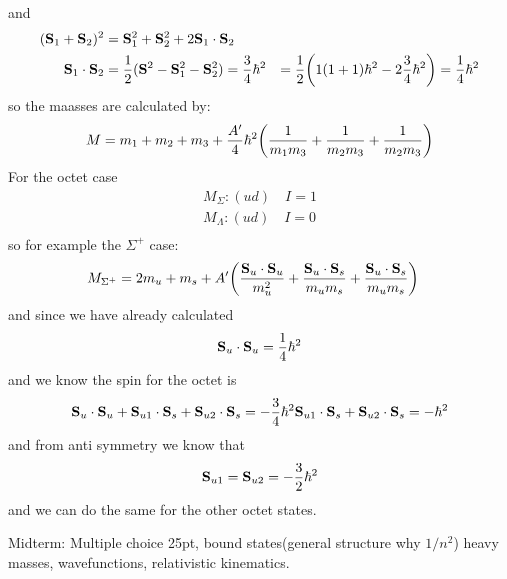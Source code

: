\documentclass[../main.tex]{subfiles}
\begin{document}
\begin{itemize}
    and
    \begin{align*}
        (\vb S_1 + \vb S_2)^2 &= \vb S_1^2 + \vb S_2^2 + 2\vb S_1 \cdot \vb S_2 \\
        \vb S_1 \cdot \vb S_2 &= \frac{1}{2} (\vb S^2 - \vb S_1^2 - \vb S_2^2) = \frac{3}{4} \hbar^2
        &= \frac{1}{2} \qt(1(1 + 1)\hbar^2 - 2 \frac{3}{4}\hbar^2) = \frac{1}{4} \hbar^2
    \end{align*}
    so the maasses are calculated  by:
    \begin{align*}
        M = m_1 + m_2 + m_3 + \frac{A'}{4}\hbar^2 \qt(\frac{1}{m_1 m_3} + \frac{1}{m_2 m_3} + \frac{1}{m_2 m_3})
    \end{align*}
    For the octet case
    \begin{align*}
        M_\Sigma: (ud) \quad I = 1 \\
        M_\Lambda: (ud) \quad I = 0 \\
    \end{align*}
    so for example the $\Sigma^+$ case:
    \begin{align*}
        M_{\Sigma^+} &= 2m_u + m_s + A' \qt(\frac{\vb S_u \cdot \vb S_u}{m_u^2} 
            + \frac{\vb S_u \cdot \vb S_s}{m_u m_s} + \frac{\vb S_u \cdot \vb S_s}{m_u m_s})
    \end{align*}
    and since we have already calculated 
    \begin{align*}
        \vb S_u \cdot \vb S_u = \frac{1}{4} \hbar^2 
    \end{align*}
    and we know the spin for the octet is
    \begin{align*}
        \vb S_u \cdot \vb S_u + \vb S_{u1} \cdot \vb S_s + \vb S_{u2} \cdot \vb S_s = -\frac{3}{4} \hbar^2
        \vb S_{u1} \cdot \vb S_s + \vb S_{u2} \cdot \vb S_s = - \hbar^2
    \end{align*}
    and from anti symmetry we know that
    \begin{align*}
        \vb S_{u1} = \vb S_{u2} = -\frac{3}{2} \hbar^2
    \end{align*}
    and we can do the same for the other octet states.
\end{itemize}
Midterm: Multiple choice 25pt, bound states(general structure why $1/n^2$) heavy masses, wavefunctions,
relativistic kinematics. 
\end{document}
